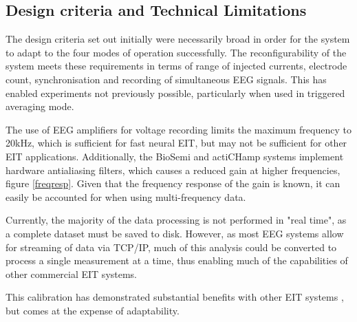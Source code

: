 \subsection{Design criteria and Technical Limitations}
The design criteria set out initially were necessarily broad in order for the system to adapt to the four modes of operation successfully. The reconfigurability of the system meets these requirements in terms of range of injected currents, electrode count, synchronisation and recording of simultaneous EEG signals. This has enabled experiments not previously possible, particularly when used in triggered averaging mode.



The use of EEG amplifiers for voltage recording limits the maximum frequency to 20kHz, which is sufficient for fast neural EIT, but may not be sufficient for other EIT applications. Additionally, the BioSemi and actiCHamp systems implement hardware antialiasing filters, which causes a reduced gain at higher frequencies, figure \ref{freqresp}. Given that the frequency response of the gain is known, it can easily be accounted for when using multi-frequency data.

Currently, the majority of the data processing is not performed in "real time", as a complete dataset must be saved to disk. However, as most EEG systems allow for streaming of data via TCP/IP, much of this analysis could be converted to process a single measurement at a time, thus enabling much of the capabilities of other commercial EIT systems.

This calibration has demonstrated substantial benefits with other EIT systems \cite{Hun_Wi_2014} \cite{khan}, but comes at the expense of adaptability.